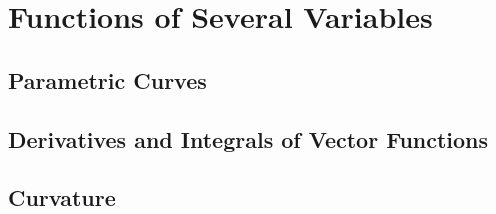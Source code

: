 \chapter{Functions of Several Variables}

\section{Parametric Curves}

\section{Derivatives and Integrals of Vector Functions}

\section{Curvature}